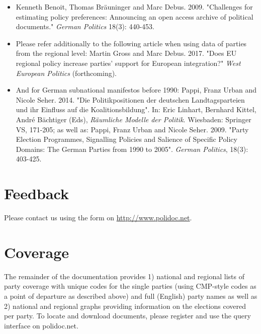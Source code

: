 \documentclass[a4paper, 12pt]{article}
\begin{document}
\begin{itemize}
\item Kenneth Benoit, Thomas Bräuninger and Marc Debus. 2009. "Challenges for estimating policy preferences: Announcing an open access archive of political documents." \textit{German Politics} 18(3): 440-453.
\item Please refer additionally to the following article when using data of parties from the regional level: Martin Gross and Marc Debus. 2017. "Does EU regional policy increase parties' support for European integration?" \textit{West European Politics} (forthcoming).
\item And for German subnational manifestos before 1990: Pappi, Franz Urban and Nicole Seher. 2014. "Die Politikpositionen der deutschen Landtagsparteien und ihr Einfluss auf die Koalitionsbildung". In: Eric Linhart, Bernhard Kittel, André Bächtiger (Eds), \textit{Räumliche Modelle der Politik}. Wiesbaden: Springer VS, 171-205; as well as: Pappi, Franz Urban and Nicole Seher. 2009. "Party Election Programmes, Signalling Policies and Salience of Specific Policy Domains: The German Parties from 1990 to 2005". \textit{German Politics}, 18(3): 403-425.
\end{itemize}

\newpage

\section{Feedback}
Please contact us using the form on \url{http://www.polidoc.net}.

\section{Coverage}
The remainder of the documentation provides 1) national and regional lists of party coverage with unique codes for the single parties (using CMP-style codes as a point of departure as described above) and full (English) party names as well as 2) national and regional graphs providing information on the elections covered per party. To locate and download documents, please register and use the query interface on polidoc.net. 


\clearpage

\begin{landscape}




\end{landscape}
\end{document}
